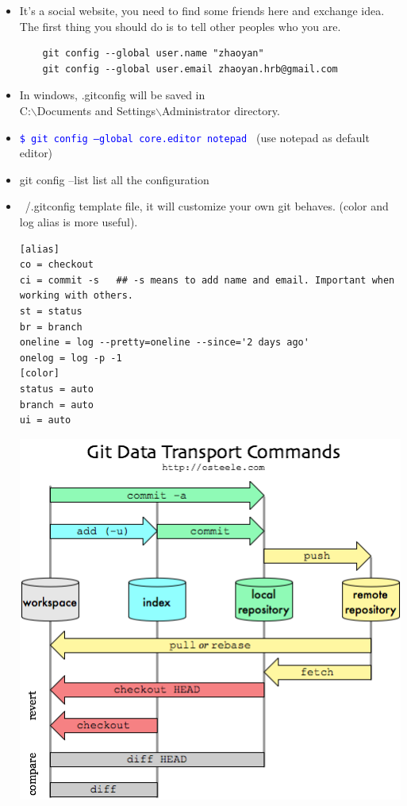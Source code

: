 \documentclass[a4paper,12pt,twoside]{book}
\newcommand{\linuxcommand}[1]{\texttt{\textcolor{blue}{\$ #1 \Pisymbol{psy}{191}}}}
\begin{document}
\begin{itemize}
\begin{itemize}
\begin{itemize}
\item It's a social website, you need to find some friends here and exchange idea. The first thing you should do is to tell other peoples who you are.  
    \begin{verbatim}
	git config --global user.name "zhaoyan"
	git config --global user.email zhaoyan.hrb@gmail.com
	\end{verbatim}

    \item In windows, .gitconfig will be saved in  \\
    C:$\backslash$Documents and Settings$\backslash$Administrator directory.
    \item \linuxcommand{git config --global core.editor notepad} (use notepad as default editor)
    \item git config --list list all the configuration
 

\item  ~/.gitconfig template file, it will customize your own git behaves. (color and log
alias is more useful).

\begin{verbatim}
[alias]
co = checkout
ci = commit -s   ## -s means to add name and email. Important when working with others.
st = status
br = branch
oneline = log --pretty=oneline --since='2 days ago'
onelog = log -p -1
[color]
status = auto
branch = auto
ui = auto
\end{verbatim}

\includegraphics[scale=0.7]{pics/git-transport} \\


\end{itemize}
\end{itemize}
\end{itemize}
\end{document}
